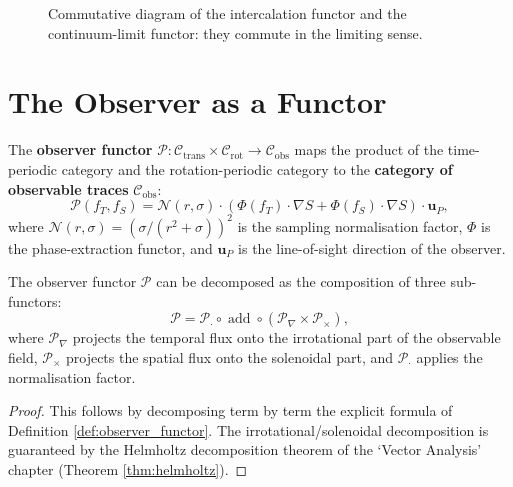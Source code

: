 \begin{figure}[htbp]
\centering
{}
\caption{Commutative diagram of the intercalation functor and the continuum-limit functor: they commute in the limiting sense.}
\label{fig:intercalation_commutation}
\end{figure}

\section{The Observer as a Functor}\label{sec:observer_functor}

\begin{definition}\label{def:observer_functor}
The \textbf{observer functor} $\mathcal{P}: \mathcal{C}_{\text{trans}} \times \mathcal{C}_{\text{rot}} \to \mathcal{C}_{\text{obs}}$ maps the product of the time-periodic category and the rotation-periodic category to the \textbf{category of observable traces} $\mathcal{C}_{\text{obs}}$:
\[
\mathcal{P}(f_T, f_S) = \mathcal{N}(r, \sigma) \cdot \left( \Phi(f_T) \cdot \nabla S + \Phi(f_S) \cdot \nabla S \right) \cdot \mathbf{u}_P,
\]
where $\mathcal{N}(r, \sigma) = (\sigma/(r^2+\sigma))^2$ is the sampling normalisation factor, $\Phi$ is the phase-extraction functor, and $\mathbf{u}_P$ is the line-of-sight direction of the observer.
\end{definition}

\begin{theorem}\label{thm:observer_functor_decomposition}
The observer functor $\mathcal{P}$ can be decomposed as the composition of three sub-functors:
\[
\mathcal{P} = \mathcal{P}_{\cdot} \circ \operatorname{add} \circ (\mathcal{P}_{\nabla} \times \mathcal{P}_{\times}),
\]
where $\mathcal{P}_{\nabla}$ projects the temporal flux onto the irrotational part of the observable field, $\mathcal{P}_{\times}$ projects the spatial flux onto the solenoidal part, and $\mathcal{P}_{\cdot}$ applies the normalisation factor.
\end{theorem}

\begin{proof}
This follows by decomposing term by term the explicit formula of Definition \ref{def:observer_functor}. The irrotational/solenoidal decomposition is guaranteed by the Helmholtz decomposition theorem of the `Vector Analysis' chapter (Theorem \ref{thm:helmholtz}).
\end{proof}

